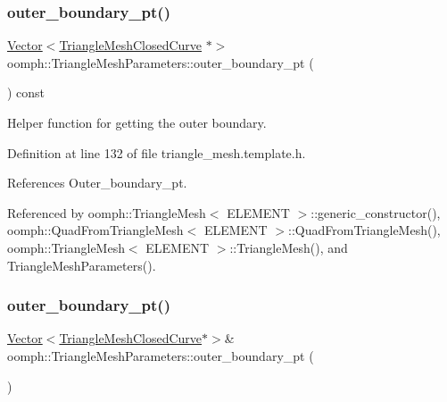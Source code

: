 \mbox{\label{classoomph_1_1TriangleMeshParameters_adf9ce760b49599e041fffb041fb4eb0e}} 
\subsubsection{\texorpdfstring{outer\+\_\+boundary\+\_\+pt()}{outer\_boundary\_pt()}\hspace{0.1cm}{\footnotesize\ttfamily [1/4]}}
{\footnotesize\ttfamily \hyperlink{classoomph_1_1Vector}{Vector}$<$\hyperlink{classoomph_1_1TriangleMeshClosedCurve}{Triangle\+Mesh\+Closed\+Curve} $\ast$$>$ oomph\+::\+Triangle\+Mesh\+Parameters\+::outer\+\_\+boundary\+\_\+pt (\begin{DoxyParamCaption}{ }\end{DoxyParamCaption}) const\hspace{0.3cm}{\ttfamily [inline]}}



Helper function for getting the outer boundary. 



Definition at line 132 of file triangle\+\_\+mesh.\+template.\+h.



References Outer\+\_\+boundary\+\_\+pt.



Referenced by oomph\+::\+Triangle\+Mesh$<$ E\+L\+E\+M\+E\+N\+T $>$\+::generic\+\_\+constructor(), oomph\+::\+Quad\+From\+Triangle\+Mesh$<$ E\+L\+E\+M\+E\+N\+T $>$\+::\+Quad\+From\+Triangle\+Mesh(), oomph\+::\+Triangle\+Mesh$<$ E\+L\+E\+M\+E\+N\+T $>$\+::\+Triangle\+Mesh(), and Triangle\+Mesh\+Parameters().

\mbox{\label{classoomph_1_1TriangleMeshParameters_aa1b1acddc11df631c8fd692866a59e12}} 
\subsubsection{\texorpdfstring{outer\+\_\+boundary\+\_\+pt()}{outer\_boundary\_pt()}\hspace{0.1cm}{\footnotesize\ttfamily [2/4]}}
{\footnotesize\ttfamily \hyperlink{classoomph_1_1Vector}{Vector}$<$\hyperlink{classoomph_1_1TriangleMeshClosedCurve}{Triangle\+Mesh\+Closed\+Curve}$\ast$$>$\& oomph\+::\+Triangle\+Mesh\+Parameters\+::outer\+\_\+boundary\+\_\+pt (\begin{DoxyParamCaption}{ }\end{DoxyParamCaption})\hspace{0.3cm}{\ttfamily [inline]}}



